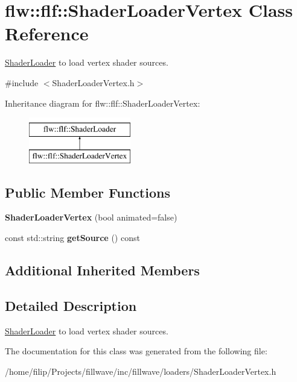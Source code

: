 \hypertarget{classflw_1_1flf_1_1ShaderLoaderVertex}{}\section{flw\+:\+:flf\+:\+:Shader\+Loader\+Vertex Class Reference}
\label{classflw_1_1flf_1_1ShaderLoaderVertex}


\hyperlink{classflw_1_1flf_1_1ShaderLoader}{Shader\+Loader} to load vertex shader sources.  




{\ttfamily \#include $<$Shader\+Loader\+Vertex.\+h$>$}

Inheritance diagram for flw\+:\+:flf\+:\+:Shader\+Loader\+Vertex\+:\begin{figure}[H]
\begin{center}
\leavevmode
\includegraphics[height=2.000000cm]{classflw_1_1flf_1_1ShaderLoaderVertex}
\end{center}
\end{figure}
\subsection*{Public Member Functions}
\begin{DoxyCompactItemize}
\item 
{\bfseries Shader\+Loader\+Vertex} (bool animated=false)\hypertarget{classflw_1_1flf_1_1ShaderLoaderVertex_a7b06917586b70d8155ed5f26cd758cd1}{}\label{classflw_1_1flf_1_1ShaderLoaderVertex_a7b06917586b70d8155ed5f26cd758cd1}

\item 
const std\+::string {\bfseries get\+Source} () const \hypertarget{classflw_1_1flf_1_1ShaderLoaderVertex_abb2f429c99739fe92e0753c6fd250784}{}\label{classflw_1_1flf_1_1ShaderLoaderVertex_abb2f429c99739fe92e0753c6fd250784}

\end{DoxyCompactItemize}
\subsection*{Additional Inherited Members}


\subsection{Detailed Description}
\hyperlink{classflw_1_1flf_1_1ShaderLoader}{Shader\+Loader} to load vertex shader sources. 

The documentation for this class was generated from the following file\+:\begin{DoxyCompactItemize}
\item 
/home/filip/\+Projects/fillwave/inc/fillwave/loaders/Shader\+Loader\+Vertex.\+h\end{DoxyCompactItemize}

